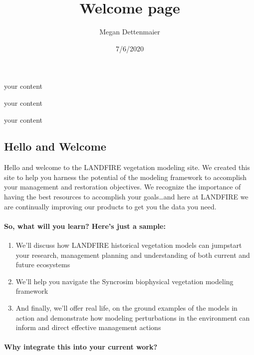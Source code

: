 \documentclass[
]{article}
\title{Welcome page}
\author{Megan Dettenmaier}
\date{7/6/2020}
\providecommand{\tightlist}{%
  \setlength{\itemsep}{0pt}\setlength{\parskip}{0pt}}
\begin{document}
\maketitle

\begin{your-class}

your content

your content

your content

\end{your-class}

\hypertarget{hello-and-welcome}{%
\subsection{Hello and Welcome}\label{hello-and-welcome}}

Hello and welcome to the LANDFIRE vegetation modeling site. We created
this site to help you harness the potential of the modeling framework to
accomplish your management and restoration objectives. We recognize the
importance of having the best resources to accomplish your
goals\ldots and here at LANDFIRE we are continually improving our
products to get you the data you need.

\hypertarget{so-what-will-you-learn-heres-just-a-sample}{%
\paragraph{So, what will you learn? Here's just a
sample:}\label{so-what-will-you-learn-heres-just-a-sample}}

\begin{enumerate}
\def\labelenumi{\arabic{enumi}.}
\tightlist
\item
  We'll discuss how LANDFIRE historical vegetation models can jumpstart
  your research, management planning and understanding of both current
  and future ecosystems
\item
  We'll help you navigate the Syncrosim biophysical vegetation modeling
  framework
\item
  And finally, we'll offer real life, on the ground examples of the
  models in action and demonstrate how modeling perturbations in the
  environment can inform and direct effective management actions
\end{enumerate}

\hypertarget{why-integrate-this-into-your-current-work}{%
\paragraph{Why integrate this into your current
work?}\label{why-integrate-this-into-your-current-work}}
\end{document}
